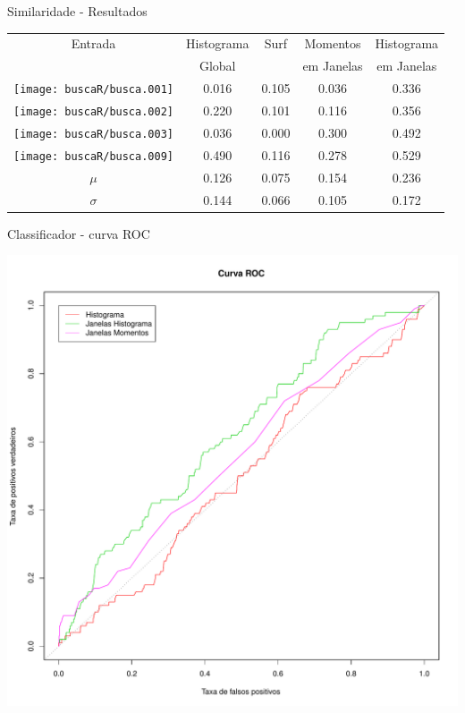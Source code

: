 \documentclass[
    style=paintings,
    paper=screen,
    blackslide,
    nopagebreaks,
    fleqn
]{powerdot}
\begin{document}
\begin{slide}{Similaridade - Resultados}
\vspace{-0.4cm}
\begin{table}[H]
\begin{center}
\begin{tabular}{|c| c | c | c | c |}
\hline
Entrada & Histograma & Surf &  Momentos  & Histograma \\
        &   Global   &      & em Janelas & em Janelas \\
\hline
\texttt{[image: buscaR/busca.001]} &
0.016 & 0.105 & 0.036 & 0.336 \\
\texttt{[image: buscaR/busca.002]} &
0.220 & 0.101 & 0.116 & 0.356 \\
\texttt{[image: buscaR/busca.003]} &
0.036 & 0.000 & 0.300 & 0.492 \\
\texttt{[image: buscaR/busca.009]} &
0.490 & 0.116 & 0.278 & 0.529 \\
\hline
$\mu$ & 0.126 & 0.075 & 0.154 & 0.236 \\
$\sigma$ & 0.144 & 0.066 & 0.105 & 0.172 \\
\hline
\end{tabular}
\end{center}
\end{table}
\end{slide}


\begin{slide}{Classificador - curva ROC}
\begin{center}
\includegraphics[width=0.65\linewidth]{img/curvaroc}
\end{center}
\end{slide}
\end{document}
